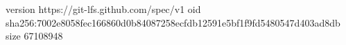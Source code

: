 version https://git-lfs.github.com/spec/v1
oid sha256:7002e8058fec166860d0b84087258ecfdb12591e5bf1f9fd5480547d403ad8db
size 67108948
